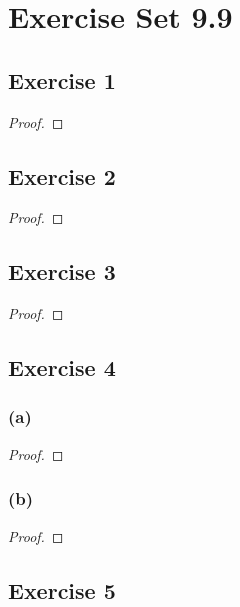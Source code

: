 \documentclass[14pt]{extarticle}
\begin{document}
\section{Exercise Set 9.9}

\subsection{Exercise 1}

\begin{proof}

\end{proof}

\subsection{Exercise 2}

\begin{proof}

\end{proof}

\subsection{Exercise 3}

\begin{proof}

\end{proof}

\subsection{Exercise 4}

\subsubsection{(a)}

\begin{proof}

\end{proof}

\subsubsection{(b)}

\begin{proof}

\end{proof}

\subsection{Exercise 5}
\end{document}
